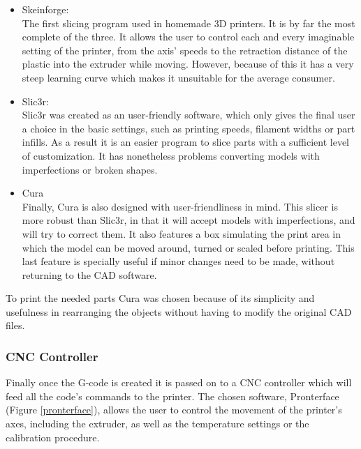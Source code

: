 			\begin{itemize}
			  
			  \item Skeinforge: \hfill \\
			  The first slicing program used in homemade 3D printers. It is by far the most complete of the three. It allows the user to control each and every imaginable setting of the printer, from the axis' speeds to the retraction distance of the plastic into the extruder while moving. However, because of this it has a very steep learning curve which makes it unsuitable for the average consumer.

			  \item Slic3r:  \hfill \\
			  Slic3r was created as an user-friendly software, which only gives the final user a choice in the basic settings, such as printing speeds, filament widths or part infills. As a result it is an easier program to slice parts with a sufficient level of customization. It has nonetheless problems converting models with imperfections or broken shapes.
			  
			  \item Cura \hfill \\
			  Finally, Cura is also designed with user-friendliness in mind. This slicer is more robust than Slic3r, in that it will accept models with imperfections, and will try to correct them. It also features a box simulating the print area in which the model can be moved around, turned or scaled before printing.
			  This last feature is specially useful if minor changes need to be made, without returning to the CAD software.
			
			\end{itemize}

		To print the needed parts Cura was chosen because of its simplicity and usefulness in rearranging the objects without having to modify the original CAD files.


		\subsubsection{CNC Controller}
		Finally once the G-code is created it is passed on to a CNC controller which will feed all the code's commands to the printer. The chosen software, Pronterface (Figure \ref{pronterface}), allows the user to control the movement of the printer's axes, including the extruder, as well as the temperature settings or the calibration procedure.  


